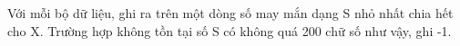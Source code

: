 Với mỗi bộ dữ liệu, ghi ra trên một dòng số may mắn dạng S nhỏ nhất chia hết cho X. Trường hợp không tồn tại số S có không quá 200 chữ số như vậy, ghi -1.  

\